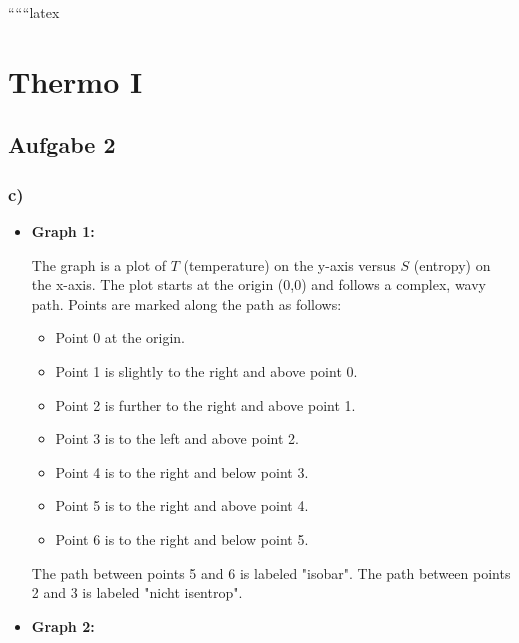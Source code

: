 
``````latex


\section*{Thermo I}
\subsection*{Aufgabe 2}

\subsubsection*{c)}

\begin{itemize}
    \item \textbf{Graph 1:}
    
    The graph is a plot of \( T \) (temperature) on the y-axis versus \( S \) (entropy) on the x-axis. The plot starts at the origin (0,0) and follows a complex, wavy path. Points are marked along the path as follows:
    \begin{itemize}
        \item Point 0 at the origin.
        \item Point 1 is slightly to the right and above point 0.
        \item Point 2 is further to the right and above point 1.
        \item Point 3 is to the left and above point 2.
        \item Point 4 is to the right and below point 3.
        \item Point 5 is to the right and above point 4.
        \item Point 6 is to the right and below point 5.
    \end{itemize}
    The path between points 5 and 6 is labeled "isobar". The path between points 2 and 3 is labeled "nicht isentrop".
    
    \item \textbf{Graph 2:}
    

\end{itemize}
